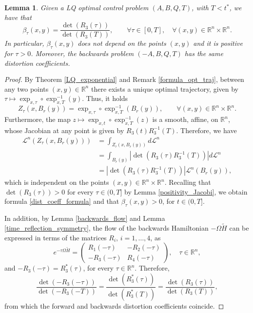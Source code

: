 \documentclass[reqno]{amsart}
\theoremstyle{plain}
\newtheorem{lem}[thm]{Lemma}
\theoremstyle{definition}
\theoremstyle{remark}
\begin{document}
		\begin{lem}\label{distortion_coefficients}
			Given a LQ optimal control problem $(A,B,Q,T)$, with $T<t^*$, we have that
			\begin{equation}\label{dist_coeff_formula}
				\beta_\tau(x,y)=\frac{\det(R_3(\tau))}{\det(R_3(T))},\qquad\forall \tau\in[0,T],\quad\forall(x,y)\in\mathbb{R}^n\times\mathbb{R}^n.
			\end{equation}
			In particular, $\beta_\tau(x,y)$ does not depend on the points $(x,y)$ and it is positive for $\tau>0$. Moreover, the backwards problem $(-A,B,Q,T)$ has the same distortion coefficients.
		\end{lem}
		\begin{proof}
			By Theorem \ref{LQ_exponential} and Remark \ref{formula_opt_traj}, between any two points $(x,y)\in\mathbb{R}^n$ there exists a unique optimal trajectory, given by $\tau\mapsto\exp_{x,\tau}\circ\exp_{x,T}^{-1}(y)$. Thus, it holds 
			\begin{equation}
				Z_\tau(x,B_r(y))=\exp_{x,\tau}\circ\exp_{x,T}^{-1}(B_r(y)),\qquad\forall(x,y)\in\mathbb{R}^n\times\mathbb{R}^n.
			\end{equation}
			Furthermore, the map $z\mapsto\exp_{x,t}\circ\exp_{x,T}^{-1}(z)$ is a smooth, affine,  on $\mathbb{R}^n$, whose Jacobian at any point is given by $R_3(t)R_3^{-1}(T)$.
			Therefore, we  have
			\begin{align}
                \mathscr{L}^n(Z_\tau(x,B_r(y)))&=\int_{Z_\tau(x,B_r(y))}d\mathscr{L}^n\\
				&=\int_{B_r(y)}|\det(R_3(\tau)R_3^{-1}(T))|d\mathscr{L}^n\\
				&=|\det(R_3(\tau)R_3^{-1}(T))|\mathscr{L}^n(B_r(y)),
			\end{align}
			which is independent on the points $(x,y)\in\mathbb{R}^n\times\mathbb{R}^n$. Recalling that $\det(R_3(\tau))>0$ for every $\tau\in(0,T]$ by Lemma \ref{positivity_Jacobi}, we obtain formula \eqref{dist_coeff_formula} and that $\beta_\tau(x,y)>0$, for $t\in(0,T]$.
       
			
			In addition, by Lemma \ref{backwards_flow} and Lemma \ref{time_reflection_symmetry}, the flow of the backwards Hamiltonian $-\Omega \tilde{H}$ can be expressed in terms of the matrices $R_i$, $i=1,\ldots,4$, as 
			\begin{equation}
				e^{-\tau\Omega\tilde{H}}=\begin{pmatrix}
					R_1(-\tau) & -R_2(-\tau)\\
					-R_3(-\tau) & R_4(-\tau)
				\end{pmatrix}, \quad \tau\in\mathbb{R}^n,
			\end{equation}
			and $-R_3(-\tau)=R_3^*(\tau)$, for every $\tau\in\mathbb{R}^n$. Therefore,
			\begin{equation}
				\frac{\det(-R_3(-\tau))}{\det(-R_3(-T))}=\frac{\det(R_3^*(\tau))}{\det(R_3^*(T))}=\frac{\det(R_3(\tau))}{\det(R_3(T))},
			\end{equation}
			from which the forward and backwards distortion coefficients coincide.
		\end{proof}
\end{document}
